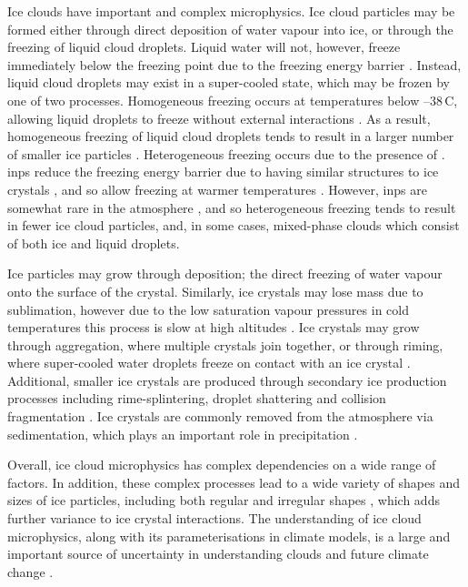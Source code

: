Ice clouds have important and complex microphysics.
Ice cloud particles may be formed either through direct deposition of water vapour into ice, or through the freezing of liquid cloud droplets.
Liquid water will not, however, freeze immediately below the freezing point due to the freezing energy barrier \citep{heymsfield_homogeneous_1993}.
Instead, liquid cloud droplets may exist in a super-cooled state, which may be frozen by one of two processes.
Homogeneous freezing occurs at temperatures below --38\,\textdegree C, allowing liquid droplets to freeze without external interactions \citep{koop_water_2000}.
As a result, homogeneous freezing of liquid cloud droplets tends to result in a larger number of smaller ice particles \citep{karcher_parameterization_2002, ickes_classical_2015}.
Heterogeneous freezing occurs due to the presence of  \citep{kanji_overview_2017a}.
\acrshort{inp}s reduce the freezing energy barrier due to having similar structures to ice crystals \citep{hoose_heterogeneous_2012}, and so allow freezing at warmer temperatures \citep{karcher_roles_2003}.
However, \acrshort{inp}s are somewhat rare in the atmosphere \citep{burrows_icenucleating_2022a}, and so heterogeneous freezing tends to result in fewer ice cloud particles, and, in some cases, mixed-phase clouds which consist of both ice and liquid droplets.

Ice particles may grow through deposition; the direct freezing of water vapour onto the surface of the crystal.
Similarly, ice crystals may lose mass due to sublimation, however due to the low saturation vapour pressures in cold temperatures this process is slow at high altitudes \citep{seeley_formation_2019}.
Ice crystals may grow through aggregation, where multiple crystals join together, or through riming, where super-cooled water droplets freeze on contact with an ice crystal \citep{taylor_observations_2016}.
Additional, smaller ice crystals are produced through secondary ice production processes including rime-splintering, droplet shattering and collision fragmentation \citep{field_secondary_2017a}.
Ice crystals are commonly removed from the atmosphere via sedimentation, which plays an important role in precipitation \citep{mulmenstadt_frequency_2015}.

Overall, ice cloud microphysics has complex dependencies on a wide range of factors.
In addition, these complex processes lead to a wide variety of shapes and sizes of ice particles, including both regular and irregular shapes \citep{waitz_situ_2022}, which adds further variance to ice crystal interactions.
The understanding of ice cloud microphysics, along with its parameterisations in climate models, is a large and important source of uncertainty in understanding clouds and future climate change \citep{sullivan_ice_2021, gasparini_opinion_2023}.


